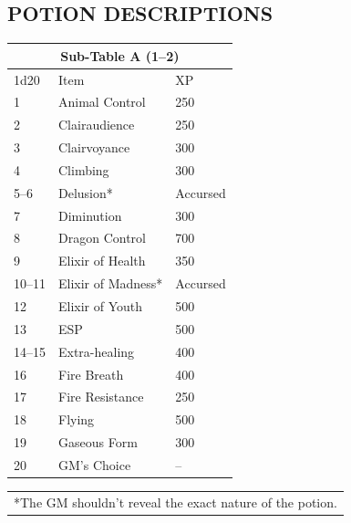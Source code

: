 \begin{multicols}{2}
\begin{minipage}{\columnwidth}
\end{minipage}

\subsection{POTION DESCRIPTIONS}

\noindent \begin{minipage}{\columnwidth}

\label{potionsa}
\noindent
\begin{tabular}{|p{}|p{}|p{}|}
\multicolumn{3}{c}{Sub-Table A (1--2)} \\
\hline
1d20	& Item	& XP \\
\hline\hline
\rowcolor[gray]{.9}1	& Animal Control	& 250 \\
2	& Clairaudience	& 250 \\
\rowcolor[gray]{.9}3	& Clairvoyance	& 300 \\
4	& Climbing	& 300 \\
\rowcolor[gray]{.9}5--6	& Delusion*	& Accursed \\
7	& Diminution	& 300 \\
\rowcolor[gray]{.9}8	& Dragon Control	& 700 \\
9	& Elixir of Health	& 350 \\
\rowcolor[gray]{.9}10--11	& Elixir of Madness*	& Accursed \\
12	& Elixir of Youth	& 500 \\
\rowcolor[gray]{.9}13	& ESP	& 500 \\
14--15	& Extra-healing	& 400 \\
\rowcolor[gray]{.9}16	& Fire Breath	& 400 \\
17	& Fire Resistance	& 250 \\
\rowcolor[gray]{.9}18	& Flying	& 500 \\
19	& Gaseous Form	& 300 \\
\rowcolor[gray]{.9}20	& GM's Choice	& -- \\
\hline
\end{tabular}
\noindent\begin{tabular}{p{}}
*The GM shouldn't reveal the exact nature of the potion. \\
\end{tabular}\vspace{.5em}

\end{minipage}


\end{multicols}
